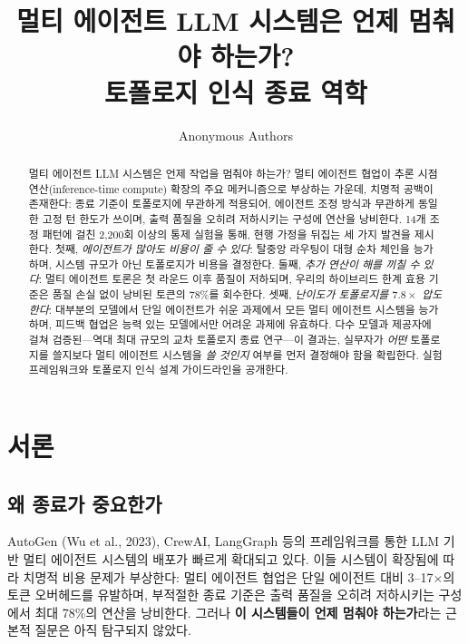 \documentclass[a4paper,11pt]{article}
\title{멀티 에이전트 LLM 시스템은 언제 멈춰야 하는가? \\ 토폴로지 인식 종료 역학}
\author{Anonymous Authors}
\date{}
\begin{document}
\maketitle

\begin{abstract}
멀티 에이전트 LLM 시스템은 언제 작업을 멈춰야 하는가? 멀티 에이전트 협업이 추론 시점 연산(inference-time compute) 확장의 주요 메커니즘으로 부상하는 가운데, 치명적 공백이 존재한다: 종료 기준이 토폴로지에 무관하게 적용되어, 에이전트 조정 방식과 무관하게 동일한 고정 턴 한도가 쓰이며, 출력 품질을 오히려 저하시키는 구성에 연산을 낭비한다. 14개 조정 패턴에 걸친 2,200회 이상의 통제 실험을 통해, 현행 가정을 뒤집는 세 가지 발견을 제시한다. 첫째, \emph{에이전트가 많아도 비용이 줄 수 있다}: 탈중앙 라우팅이 대형 순차 체인을 능가하며, 시스템 규모가 아닌 토폴로지가 비용을 결정한다. 둘째, \emph{추가 연산이 해를 끼칠 수 있다}: 멀티 에이전트 토론은 첫 라운드 이후 품질이 저하되며, 우리의 하이브리드 한계 효용 기준은 품질 손실 없이 낭비된 토큰의 78\%를 회수한다. 셋째, \emph{난이도가 토폴로지를 $7.8\times$ 압도한다}: 대부분의 모델에서 단일 에이전트가 쉬운 과제에서 모든 멀티 에이전트 시스템을 능가하며, 피드백 협업은 능력 있는 모델에서만 어려운 과제에 유효하다. 다수 모델과 제공자에 걸쳐 검증된---역대 최대 규모의 교차 토폴로지 종료 연구---이 결과는, 실무자가 \emph{어떤} 토폴로지를 쓸지보다 멀티 에이전트 시스템을 \emph{쓸 것인지} 여부를 먼저 결정해야 함을 확립한다. 실험 프레임워크와 토폴로지 인식 설계 가이드라인을 공개한다.
\end{abstract}

\section{서론}

\subsection{왜 종료가 중요한가}

AutoGen (Wu et al., 2023), CrewAI, LangGraph 등의 프레임워크를 통한 LLM 기반 멀티 에이전트 시스템의 배포가 빠르게 확대되고 있다. 이들 시스템이 확장됨에 따라 치명적 비용 문제가 부상한다: 멀티 에이전트 협업은 단일 에이전트 대비 3--17$\times$의 토큰 오버헤드를 유발하며, 부적절한 종료 기준은 출력 품질을 오히려 저하시키는 구성에서 최대 78\%의 연산을 낭비한다. 그러나 \textbf{이 시스템들이 언제 멈춰야 하는가}라는 근본적 질문은 아직 탐구되지 않았다.
\end{document}
